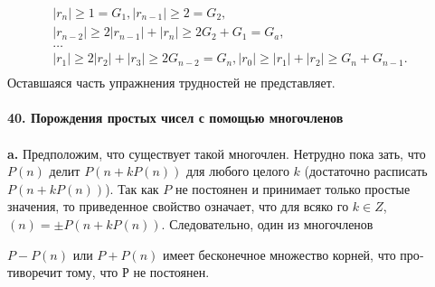 \documentclass{mai_book}
\begin{document}
		$$\begin{array}{ccccc}
				|r_n| \geqslant 1 = G_1, |r_{n-1}| \geqslant 2 = G_2,\\
				|r_{n-2}| \geqslant 2|r_{n-1}| + |r_n| \geqslant 2G_2 + G_1 = G_a,\\
				\ldots                                                                                        & \\
				|r_1| \geqslant 2|r_2|+ |r_3| \geqslant 2G_{n-2} = G_n, |r_0| \geqslant |r_1| + |r_2| \geqslant G_n + G_{n-1}.\\
		\end{array}$$
Оставшаяся часть упражнения трудностей не представляет.\\
\\
\noindent\textbf{40. Порождения простых чисел с помощью многочленов}\\
\\
\hspace*{15pt}\textbf{a.} Предположим, что существует такой многочлен. Нетрудно пока­\linebreak
зать, что $P(n)$ делит $P(n + kP(n))$ для любого целого $k$ (достаточно\linebreak
расписать $P(n + kP(n))$). Так как $P$ не постоянен и принимает только\linebreak
простые значения, то приведенное свойство означает, что для всяко­\linebreak
го $k \in Z$, $(n) = \pm P(n + kP(n)).$  Следовательно, один из многочленов\linebreak

\pagebreak
\noindent$P - P(n)$ или $P + P(n)$ имеет бесконечное множество корней, что про­\linebreak
тиворечит тому, что Р не постоянен.
\end{document}
